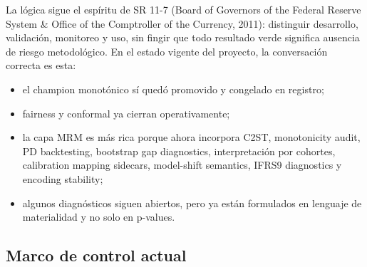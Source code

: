 \documentclass[
  spanish,
  11pt,
  letterpaper,
]{scrbook}
\providecommand{\tightlist}{%
  \setlength{\itemsep}{0pt}\setlength{\parskip}{0pt}}
\theoremstyle{plain}
\theoremstyle{remark}
\begin{document}
La lógica sigue el espíritu de SR 11-7 (Board of Governors of the
Federal Reserve System \& Office of the Comptroller of the Currency,
2011): distinguir desarrollo, validación, monitoreo y uso, sin fingir
que todo resultado verde significa ausencia de riesgo metodológico. En
el estado vigente del proyecto, la conversación correcta es esta:

\begin{itemize}
\tightlist
\item
  el champion monotónico sí quedó promovido y congelado en registro;
\item
  fairness y conformal ya cierran operativamente;
\item
  la capa MRM es más rica porque ahora incorpora C2ST, monotonicity
  audit, PD backtesting, bootstrap gap diagnostics, interpretación por
  cohortes, calibration mapping sidecars, model-shift semantics, IFRS9
  diagnostics y encoding stability;
\item
  algunos diagnósticos siguen abiertos, pero ya están formulados en
  lenguaje de materialidad y no solo en p-values.
\end{itemize}

\subsection{Marco de control actual}\label{marco-de-control-actual}
\end{document}
